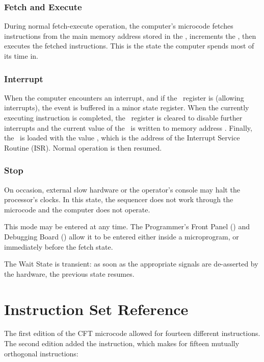 \subsubsection{Fetch and Execute}

During normal fetch-execute operation, the computer's microcode fetches
instructions from the main memory address stored in the \PC, increments the
\PC, then executes the fetched instructions. This is the state the computer
spends most of its time in.

\subsubsection{Interrupt}

When the computer encounters an interrupt, and if the \Ireg\ register is {} (allowing interrupts), the event is buffered in a minor state
register. When the currently executing instruction is completed, the
\Ireg\ register is cleared to disable further interrupts and the current value
of the \PC\ is written to memory address . Finally, the \PC\ is
loaded with the value , which is the address of the Interrupt Service
Routine (ISR). Normal operation is then resumed.

\subsubsection{Stop}

On occasion, external slow hardware or the operator's console may halt the
processor's clocks. In this state, the sequencer does not work through the
microcode and the computer does not operate.

This mode may be entered at any time. The Programmer's Front Panel
() and Debugging Board () allow it to be entered
either inside a microprogram, or immediately before the fetch state.

The Wait State is transient: as soon as the appropriate signals are de-asserted
by the hardware, the previous state resumes.

\section{Instruction Set Reference}
\label{sec:instruction-set-reference}

The first edition of the CFT microcode allowed for fourteen different
instructions. The second edition added the  instruction,
which makes for fifteen mutually orthogonal instructions:

